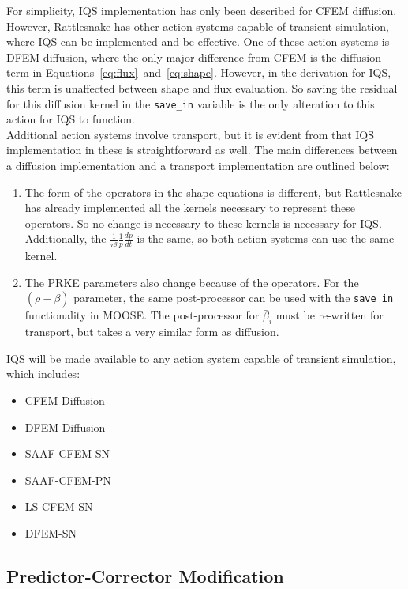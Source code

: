 For simplicity, IQS implementation has only been described for CFEM diffusion.  However, Rattlesnake has other action systems capable of transient simulation, where IQS can be implemented and be effective.  One of these action systems is DFEM diffusion, where the only major difference from CFEM is the diffusion term in Equations~\eqref{eq:flux}~and~\eqref{eq:shape}.  However, in the derivation for IQS, this term is unaffected between shape and flux evaluation.  So saving the residual for this diffusion kernel in the \texttt{save\_in} variable is the only alteration to this action for IQS to function.\\
Additional action systems involve transport, but it is evident from  that IQS implementation in these is straightforward as well.  The main differences between a diffusion implementation and a transport implementation are outlined below:
\begin{enumerate}
\item The form of the operators in the shape equations is different, but Rattlesnake has already implemented all the kernels necessary to represent these operators.  So no change is necessary to these kernels is necessary for IQS.  Additionally, the $\frac{1}{v^g}\frac{1}{p}\frac{dp}{dt}$ is the same, so both action systems can use the same kernel.
\item The PRKE parameters also change because of the operators.  For the $(\rho-\bar{\beta})$ parameter, the same post-processor can be used with the \texttt{save\_in} functionality in MOOSE.  The post-processor for $\bar{\beta}_i$ must be re-written for transport, but takes a very similar form as diffusion.
\end{enumerate}

IQS will be made available to any action system capable of transient simulation, which includes:
\begin{itemize}
\item CFEM-Diffusion
\item DFEM-Diffusion
\item SAAF-CFEM-SN
\item SAAF-CFEM-PN
\item LS-CFEM-SN
\item DFEM-SN
\end{itemize}

\subsection{Predictor-Corrector Modification}

